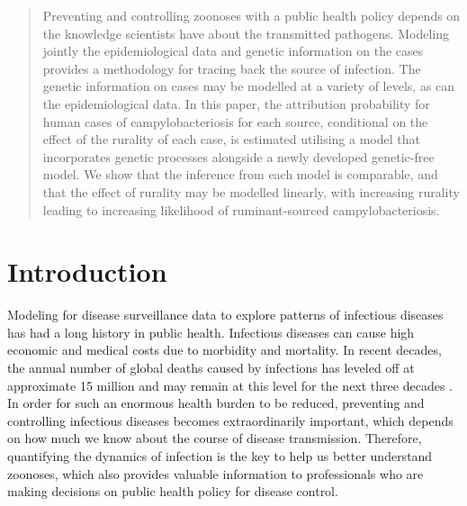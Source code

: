 \documentclass[times, doublespace]{WileyNJD-v2}%
\begin{document}

\begin{abstract}

Preventing and controlling zoonoses with a public health policy depends on the knowledge scientists have about the transmitted pathogens. Modeling jointly the epidemiological data and genetic information on the cases provides a methodology for tracing back the source of infection. The genetic information on cases may be modelled at a variety of levels, as can the epidemiological data. In this paper, the attribution probability for human cases of campylobacteriosis for each source, conditional on the effect of the rurality of each case, is estimated utilising a model that incorporates genetic processes alongside a newly developed genetic-free model. We show that the inference from each model is comparable, and that the effect of rurality may be modelled linearly, with increasing rurality leading to increasing likelihood of ruminant-sourced campylobacteriosis.
  
\end{abstract}


\section{Introduction}
Modeling for disease surveillance data to explore patterns of infectious diseases has had a long history in public health. Infectious diseases can cause high economic and medical costs due to morbidity and mortality. In recent decades, the annual number of global deaths caused by infections has leveled off at approximate 15 million and may remain at this level for the next three decades \cite{DyeC, WHOM}. In order for such an enormous health burden to be reduced, preventing and controlling infectious diseases becomes extraordinarily important, which depends on how much we know about the course of disease transmission. Therefore, quantifying the dynamics of infection is the key to help us better understand zoonoses, which also provides valuable information to professionals who are making decisions on public health policy for disease control. 
\end{document}
